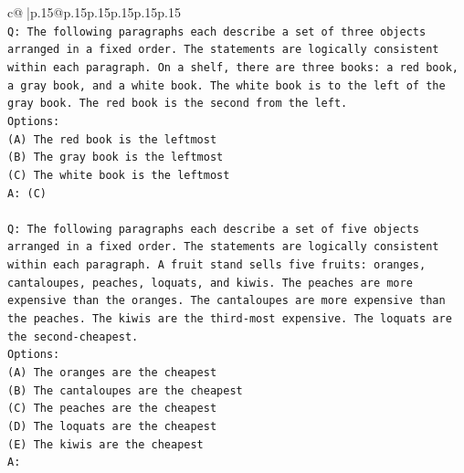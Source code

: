 \documentclass{article}
\begin{document}
{\begin{supertabular}{c@{$\;$}|p{.15\linewidth}@{}p{.15\linewidth}p{.15\linewidth}p{.15\linewidth}p{.15\linewidth}p{.15\linewidth}}
{{{\\ 
\texttt{Q: The following paragraphs each describe a set of three objects arranged in a fixed order. The statements are logically consistent within each paragraph. On a shelf, there are three books: a red book, a gray book, and a white book. The white book is to the left of the gray book. The red book is the second from the left.} \\
\texttt{Options:} \\
\texttt{(A) The red book is the leftmost} \\
\texttt{(B) The gray book is the leftmost} \\
\texttt{(C) The white book is the leftmost} \\
\texttt{A: (C)} \\
\\ 
\texttt{Q: The following paragraphs each describe a set of five objects arranged in a fixed order. The statements are logically consistent within each paragraph. A fruit stand sells five fruits: oranges, cantaloupes, peaches, loquats, and kiwis. The peaches are more expensive than the oranges. The cantaloupes are more expensive than the peaches. The kiwis are the third{-}most expensive. The loquats are the second{-}cheapest.} \\
\texttt{Options:} \\
\texttt{(A) The oranges are the cheapest} \\
\texttt{(B) The cantaloupes are the cheapest} \\
\texttt{(C) The peaches are the cheapest} \\
\texttt{(D) The loquats are the cheapest} \\
\texttt{(E) The kiwis are the cheapest} \\
\texttt{A:} \\
            }
        }
    }
     \\ \\


\end{supertabular}}
\end{document}
